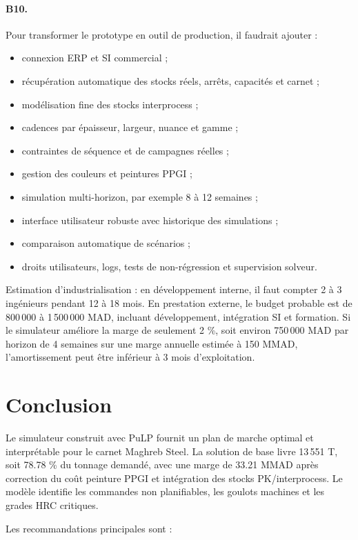 \documentclass[12pt,a4paper]{article}
\newcommand{\question}[1]{\paragraph{\textcolor{blue!50!black}{#1.}}}
\newcommand{\sectiontarget}[1]{}
\begin{document}
\question{B10}
Pour transformer le prototype en outil de production, il faudrait ajouter :

\begin{itemize}
    \item connexion ERP et SI commercial ;
    \item récupération automatique des stocks réels, arrêts, capacités et carnet ;
    \item modélisation fine des stocks interprocess ;
    \item cadences par épaisseur, largeur, nuance et gamme ;
    \item contraintes de séquence et de campagnes réelles ;
    \item gestion des couleurs et peintures PPGI ;
    \item simulation multi-horizon, par exemple 8 à 12 semaines ;
    \item interface utilisateur robuste avec historique des simulations ;
    \item comparaison automatique de scénarios ;
    \item droits utilisateurs, logs, tests de non-régression et supervision solveur.
\end{itemize}

Estimation d'industrialisation : en développement interne, il faut compter 2 à 3 ingénieurs pendant 12 à 18 mois. En prestation externe, le budget probable est de 800\,000 à 1\,500\,000 MAD, incluant développement, intégration SI et formation. Si le simulateur améliore la marge de seulement 2 \%, soit environ 750\,000 MAD par horizon de 4 semaines sur une marge annuelle estimée à 150 MMAD, l'amortissement peut être inférieur à 3 mois d'exploitation.

\clearpage
\section{Conclusion}
\sectiontarget{0.5 page}

Le simulateur construit avec PuLP fournit un plan de marche optimal et interprétable pour le carnet Maghreb Steel. La solution de base livre 13\,551 T, soit 78.78 \% du tonnage demandé, avec une marge de 33.21 MMAD après correction du coût peinture PPGI et intégration des stocks PK/interprocess. Le modèle identifie les commandes non planifiables, les goulots machines et les grades HRC critiques.

Les recommandations principales sont :
\end{document}
